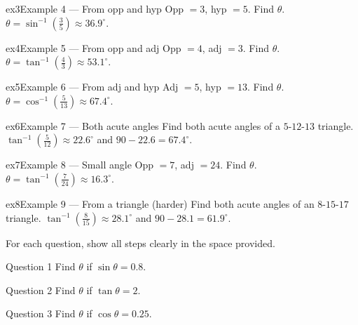 \documentclass[11pt]{article}
\begin{document}
\begin{example}{ex3}{Example 4 --- From opp and hyp}
Opp $=3$, hyp $=5$. Find $\theta$.
\soln $\theta=\sin^{-1}\!\left(\tfrac35\right)\approx36.9^\circ.$
\end{example}

\begin{example}{ex4}{Example 5 --- From opp and adj}
Opp $=4$, adj $=3$. Find $\theta$.
\soln $\theta=\tan^{-1}\!\left(\tfrac43\right)\approx53.1^\circ.$
\end{example}

\begin{example}{ex5}{Example 6 --- From adj and hyp}
Adj $=5$, hyp $=13$. Find $\theta$.
\soln $\theta=\cos^{-1}\!\left(\tfrac{5}{13}\right)\approx67.4^\circ.$
\end{example}

\begin{example}{ex6}{Example 7 --- Both acute angles}
Find both acute angles of a $5$-$12$-$13$ triangle.
\soln $\tan^{-1}\!\left(\tfrac{5}{12}\right)\approx22.6^\circ$ and $90-22.6=67.4^\circ.$
\end{example}

\begin{example}{ex7}{Example 8 --- Small angle}
Opp $=7$, adj $=24$. Find $\theta$.
\soln $\theta=\tan^{-1}\!\left(\tfrac{7}{24}\right)\approx16.3^\circ.$
\end{example}

\begin{example}{ex8}{Example 9 --- From a triangle (harder)}
Find both acute angles of an $8$-$15$-$17$ triangle.
\soln $\tan^{-1}\!\left(\tfrac{8}{15}\right)\approx28.1^\circ$ and $90-28.1=61.9^\circ.$
\end{example}

\clearpage
{}
For each question, show all steps clearly in the space provided.

\begin{qbox}{Question 1}
Find $\theta$ if $\sin\theta=0.8$.\workspace{1.8cm}
\end{qbox}

\begin{qbox}{Question 2}
Find $\theta$ if $\tan\theta=2$.\workspace{1.8cm}
\end{qbox}

\begin{qbox}{Question 3}
Find $\theta$ if $\cos\theta=0.25$.\workspace{1.8cm}
\end{qbox}
\end{document}
